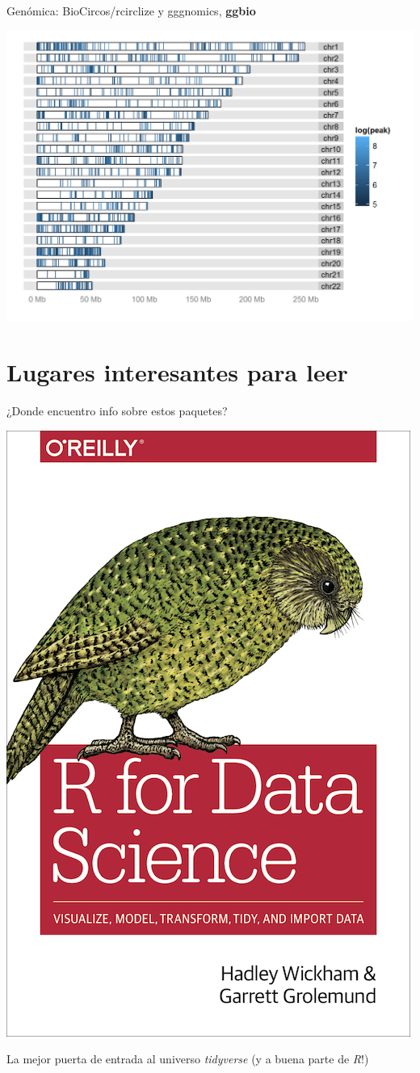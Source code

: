 \documentclass[
  10pt,
  ignorenonframetext,
]{beamer}
\begin{document}
\begin{frame}{Genómica: BioCircos/rcirclize y gggnomics, \textbf{ggbio}}
\protect\hypertarget{genuxf3mica-biocircosrcirclize-y-gggnomics-ggbio-2}{}
\begin{center}\includegraphics[width=0.95\linewidth]{../../imgs/ggnomics_2} \end{center}
\end{frame}

\hypertarget{lugares-interesantes-para-leer}{%
\section{Lugares interesantes para
leer}\label{lugares-interesantes-para-leer}}

\begin{frame}{¿Donde encuentro info sobre estos paquetes?}
\protect\hypertarget{donde-encuentro-info-sobre-estos-paquetes}{}
\begin{center}\includegraphics[width=0.45\linewidth]{../../imgs/cover_rfordatascience} \end{center}

La mejor puerta de entrada al universo \emph{tidyverse} (y a buena parte
de \emph{R}!)
\end{frame}
\end{document}
